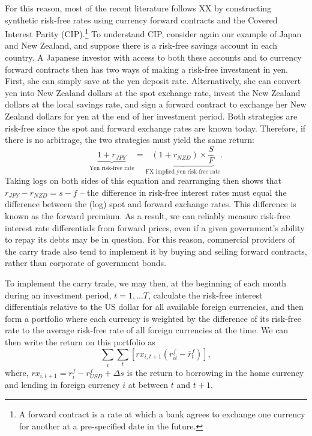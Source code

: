\documentclass{ar-1col}
\begin{document}
For this reason, most of the recent literature follows XX by constructing synthetic risk-free rates using currency forward contracts and the Covered Interest Parity (CIP).\footnote{A forward contract is a rate 
at which a bank agrees to exchange one currency for another at a
pre-specified date in the future.} To understand CIP, consider again our example of Japan and New Zealand, and suppose there is a risk-free savings account in each country. A Japanese investor with access to both these accounts and to currency forward contracts then has two ways of making a risk-free investment in yen. First, she can simply save at the yen deposit rate. Alternatively, 
she can convert yen into New Zealand dollars at the spot exchange 
rate, invest the New Zealand dollars at the local savings rate, and sign a 
forward contract to exchange her New Zealand dollars for yen at the 
end of her investment period. Both strategies are risk-free
since the spot and forward exchange rates are known today. Therefore, if there is no arbitrage, the two strategies must yield the same return:
\begin{equation}
    \underbrace{1 + r_{JPY}}_{\text{Yen risk-free rate}}
    = \underbrace{
    (1 + r_{NZD}) \times \frac{S}{F}
    }_{\text{FX implied yen risk-free rate}}.
\end{equation}
Taking logs on both sides of this equation and rearranging then shows that $r_{JPY}-r_{NZD}=s-f$ -- the difference in risk-free interest rates must equal the difference between the (log) spot and forward exchange rates. This difference is known
as the forward premium. As a result, we can reliably measure risk-free interest rate differentials from forward prices, even if a given government's ability to repay its debts may be in question. For this reason, commercial providers of the carry trade also tend to implement it by buying and selling forward contracts, rather than corporate of government bonds.


To implement the carry trade, we may then, at the beginning of each month during an investment period, $t=1,...T$, calculate the risk-free interest differentials relative to the US dollar for all available foreign currencies, and then form a portfolio where each currency is weighted by the
difference of its risk-free rate to the
average risk-free rate of all foreign currencies at the time. We can then write the return on this portfolio
as
\begin{equation}\label{eq_carry}
\textstyle\sum_{i}\sum_t\left[ rx_{i,t+1}\left( r^f_{it}-\overline{r}^f_{t}\right) \right] ,
\label{eq_CT}
\end{equation}%
where, $rx_{i,t+1}=r^f_i-r^f_{USD}+\Delta s$ is the return to borrowing in the home currency and lending in foreign currency $i$ at between $t$ and $t+1$.
\end{document}
